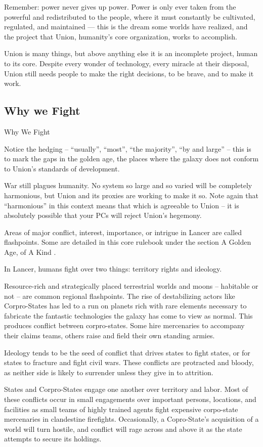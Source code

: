 Remember: power never gives up power. Power is only ever taken from the powerful and
redistributed to the people, where it must constantly be cultivated, regulated, and maintained —
this is the dream some worlds have realized, and the project that Union, humanity’s core
organization, works to accomplish.


Union is many things, but above anything else it is an incomplete project, human to its core.
Despite every wonder of technology, every miracle at their disposal, Union still needs people to
make the right decisions, to be brave, and to make it work.

\subsection{Why we Fight}
Why We Fight

Notice the hedging -- “usually”, “most”, “the majority”, “by and large” -- this is to mark the gaps
in the golden age, the places where the galaxy does not conform to Union’s standards of
development.





War still plagues humanity. No system so large and so varied will be completely harmonious, but
Union and its proxies are working to make it so. Note again that “harmonious” in this context
means that which is agreeable to Union -- it is absolutely possible that your PCs will reject
Union’s hegemony.


Areas of major conflict, interest, importance, or intrigue in Lancer are called flashpoints. Some
are detailed in this core rulebook under the section A Golden Age, of A Kind .


In Lancer, humans fight over two things: territory rights and ideology.


Resource-rich and strategically placed terrestrial worlds and moons -- habitable or not -- are
common regional flashpoints. The rise of destabilizing actors like Corpro-States has led to a run
on planets rich with rare elements necessary to fabricate the fantastic technologies the galaxy
has come to view as normal. This produces conflict between corpro-states. Some hire
mercenaries to accompany their claims teams, others raise and field their own standing armies.


Ideology tends to be the seed of conflict that drives states to fight states, or for states to fracture
and fight civil wars. These conflicts are protracted and bloody, as neither side is likely to
surrender unless they give in to attrition.


States and Corpro-States engage one another over territory and labor. Most of these conflicts
occur in small engagements over important persons, locations, and facilities as small teams of
highly trained agents fight expensive corpo-state mercenaries in clandestine firefights.
Occasionally, a Copro-State’s acquisition of a world will turn hostile, and conflict will rage across
and above it as the state attempts to secure its holdings.

